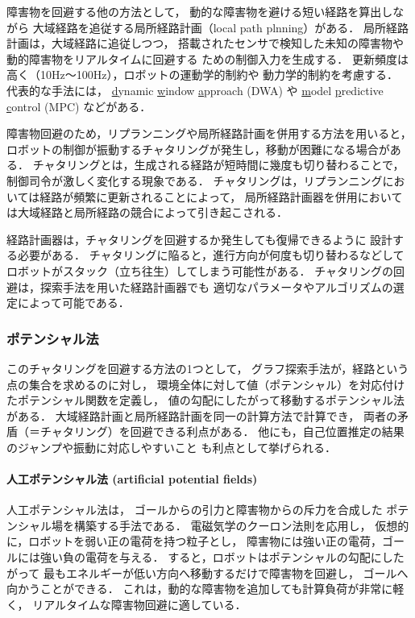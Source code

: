 障害物を回避する他の方法として，
動的な障害物を避ける短い経路を算出しながら
大域経路を追従する局所経路計画（local path plnning）がある．
局所経路計画は，大域経路に追従しつつ，
搭載されたセンサで検知した未知の障害物や動的障害物をリアルタイムに回避する
ための制御入力を生成する．
更新頻度は高く（10Hz〜100Hz），ロボットの運動学的制約や
動力学的制約を考慮する．
代表的な手法には，
\underline{d}ynamic \underline{w}indow \underline{a}pproach (DWA) や
\underline{m}odel \underline{p}redictive \underline{c}ontrol (MPC) などがある．

障害物回避のため，リプランニングや局所経路計画を併用する方法を用いると，
ロボットの制御が振動するチャタリングが発生し，移動が困難になる場合がある．
チャタリングとは，生成される経路が短時間に幾度も切り替わることで，
制御司令が激しく変化する現象である．
チャタリングは，リプランニングにおいては経路が頻繁に更新されることによって，
局所経路計画器を併用においては大域経路と局所経路の競合によって引き起こされる．

経路計画器は，チャタリングを回避するか発生しても復帰できるように
設計する必要がある．
チャタリングに陥ると，進行方向が何度も切り替わるなどして
ロボットがスタック（立ち往生）してしまう可能性がある．
チャタリングの回避は，探索手法を用いた経路計画器でも
適切なパラメータやアルゴリズムの選定によって可能である．

\subsubsection{ポテンシャル法}
このチャタリングを回避する方法の1つとして，
グラフ探索手法が，経路という点の集合を求めるのに対し，
環境全体に対して値（ポテンシャル）を対応付けたポテンシャル関数を定義し，
値の勾配にしたがって移動するポテンシャル法がある．
大域経路計画と局所経路計画を同一の計算方法で計算でき，
両者の矛盾（＝チャタリング）を回避できる利点がある．
他にも，自己位置推定の結果のジャンプや振動に対応しやすいこと
も利点として挙げられる．

\paragraph{人工ポテンシャル法 (artificial potential fields)}
人工ポテンシャル法は，
ゴールからの引力と障害物からの斥力を合成した
ポテンシャル場を構築する手法である\cite{Khatib1985}．
電磁気学のクーロン法則を応用し，
仮想的に，ロボットを弱い正の電荷を持つ粒子とし，
障害物には強い正の電荷，ゴールには強い負の電荷を与える．
すると，ロボットはポテンシャルの勾配にしたがって
最もエネルギーが低い方向へ移動するだけで障害物を回避し，
ゴールへ向かうことができる．
これは，動的な障害物を追加しても計算負荷が非常に軽く，
リアルタイムな障害物回避に適している．

